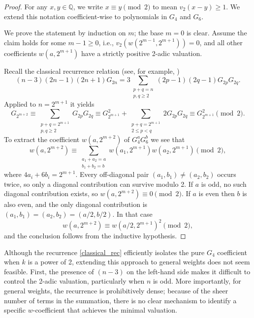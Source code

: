 \documentclass[12pt]{amsart}
\begin{document}
\begin{proof}

For any $x, y \in \mathbb{Q}$, we write $x \equiv y \pmod 2$ to mean $v_2(x - y) \ge 1$. We extend this notation coefficient-wise to polynomials in $G_4$ and $G_6$. 

We prove the statement by induction on $m$; the base $m=0$ is clear. Assume the claim holds for some $m-1 \ge 0$, i.e., $v_2(w(2^{m-1}, 2^{m+1})) = 0$, and all other coefficients $w(a, 2^{m+1})$ have a strictly positive 2-adic valuation. 

Recall the classical recurrence relation (see, for example, \cite[(59.6)]{Radem})
\begin{equation}  \label{classical_rec}
(n-3)(2n-1)(2n+1)G_{2n} = 3 \sum_{\substack{p+q=n \\ p,q \ge 2}} (2p-1)(2q-1)G_{2p}G_{2q}.
\end{equation}
Applied to $n=2^{m+1}$ it yields
\[ 
G_{2^{m+2}} \equiv  \sum_{\substack{p+q=2^{m+1} \\ p,q \ge 2}} G_{2p}G_{2q} 
 \equiv G_{2^{m+1}}^2+\sum_{\substack{p+q=2^{m+1} \\ 2\le p<q}} 2G_{2p}G_{2q} \equiv G_{2^{m+1}}^2 \pmod 2. 
\]
To extract the coefficient $w(a, 2^{m+2})$ of $G_4^a G_6^b$ we see that 
$$w(a, 2^{m+2}) \equiv \sum_{\substack{a_1+a_2=a \\ b_1+b_2=b}} w(a_1, 2^{m+1}) w(a_2, 2^{m+1}) \pmod 2,$$where $4a_i + 6b_i = 2^{m+1}$. Every off-diagonal pair $(a_1, b_1) \neq (a_2, b_2)$  occurs twice, so only a diagonal contribution can survive modulo 2. If $a$ is odd, no such diagonal contribution exists, so $w(a,2^{m+2}) \equiv 0\pmod 2$. If $a$ is even then $b$ is also even, and the only diagonal contribution is $(a_1,b_1)=(a_2,b_2)=(a/2,b/2)$. In that case \[w(a, 2^{m+2}) \equiv  w(a/2, 2^{m+1})^2 \pmod 2,\] and the conclusion follows from the inductive hypothesis. 

\end{proof}

Although the recurrence \eqref{classical_rec} efficiently isolates the pure $G_4$ coefficient when $k$ is a power of 2, extending this approach to general weights does not seem feasible. First, the presence of $(n-3)$ on the left-hand side makes it difficult to control the 2-adic valuation, particularly when $n$ is odd. More importantly, for general weights, the recurrence is prohibitively dense; because of the sheer number of terms in the summation, there is no clear mechanism to identify a specific $w$-coefficient that achieves the minimal valuation.
\end{document}
